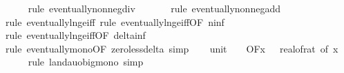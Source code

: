 \begin{isabellebody}
\ \ \ \ \isamarkupfalse%
\ {\isacharparenleft}{\kern0pt}rule\ eventually{\isacharunderscore}{\kern0pt}nonneg{\isacharunderscore}{\kern0pt}div{\isacharparenright}{\kern0pt}\isanewline
\ \ \ \ \ \isamarkupfalse%
\ {\isacharparenleft}{\kern0pt}rule\ eventually{\isacharunderscore}{\kern0pt}nonneg{\isacharunderscore}{\kern0pt}add{\isacharparenright}{\kern0pt}\isanewline
\ \ \ \ \ \isamarkupfalse%
\ {\isacharparenleft}{\kern0pt}rule\ eventually{\isacharunderscore}{\kern0pt}ln{\isacharunderscore}{\kern0pt}ge{\isacharunderscore}{\kern0pt}iff{\isacharcomma}{\kern0pt}\ rule\ eventually{\isacharunderscore}{\kern0pt}ln{\isacharunderscore}{\kern0pt}ge{\isacharunderscore}{\kern0pt}iff{\isacharbrackleft}{\kern0pt}OF\ n{\isacharunderscore}{\kern0pt}inf{\isacharbrackright}{\kern0pt}{\isacharparenright}{\kern0pt}\isanewline
\ \ \ \ \isamarkupfalse%
\ {\isacharparenleft}{\kern0pt}rule\ eventually{\isacharunderscore}{\kern0pt}ln{\isacharunderscore}{\kern0pt}ge{\isacharunderscore}{\kern0pt}iff{\isacharbrackleft}{\kern0pt}OF\ delta{\isacharunderscore}{\kern0pt}inf{\isacharbrackright}{\kern0pt}{\isacharparenright}{\kern0pt}\isanewline
\ \ \ \ \isamarkupfalse%
\ {\isacharparenleft}{\kern0pt}rule\ eventually{\isacharunderscore}{\kern0pt}mono{\isacharbrackleft}{\kern0pt}OF\ zero{\isacharunderscore}{\kern0pt}less{\isacharunderscore}{\kern0pt}delta{\isacharbrackright}{\kern0pt}{\isacharcomma}{\kern0pt}\ simp{\isacharparenright}{\kern0pt}\isanewline
\isanewline
\ \ \isamarkupfalse%
\ unit{\isacharunderscore}{\kern0pt}{}{\isacharcolon}{\kern0pt}\ {\isachardoublequoteopen}{\isacharparenleft}{\kern0pt}{\isasymlambda}{\isacharunderscore}{\kern0pt}{\isachardot}{\kern0pt}\ {}{\isacharparenright}{\kern0pt}\ {\isasymin}\ O{\isacharbrackleft}{\kern0pt}{\isacharquery}{\kern0pt}F{\isacharbrackright}{\kern0pt}{\isacharparenleft}{\kern0pt}{\isasymlambda}x{\isachardot}{\kern0pt}\ {}\ {\isacharslash}{\kern0pt}\ {\isacharparenleft}{\kern0pt}real{\isacharunderscore}{\kern0pt}of{\isacharunderscore}{\kern0pt}rat\ {\isacharparenleft}{\kern0pt}{\isasymdelta}{\isacharunderscore}{\kern0pt}of\ x{\isacharparenright}{\kern0pt}{\isacharparenright}{\kern0pt}\ \isanewline
\ \ \ \ \isamarkupfalse%
\ {\isacharparenleft}{\kern0pt}rule\ landau{\isacharunderscore}{\kern0pt}o{\isachardot}{\kern0pt}big{\isacharunderscore}{\kern0pt}mono{\isacharcomma}{\kern0pt}\ simp{\isacharparenright}{\kern0pt}\isanewline

\end{isabellebody}
